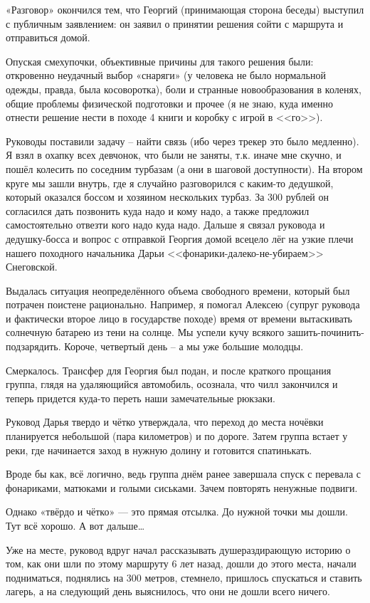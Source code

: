 «Разговор» окончился тем, что Георгий (принимающая сторона беседы) выступил с публичным заявлением: он заявил о принятии решения сойти с маршрута и отправиться домой.

Опуская смехупочки, объективные причины для такого решения были: откровенно неудачный выбор «снаряги» (у человека не было нормальной одежды, правда, была косоворотка), боли и странные новообразования в коленях, общие проблемы физической подготовки и прочее (я не знаю, куда именно отнести решение нести в походе 4 книги и коробку с игрой в <<го>>).

Руководы поставили задачу – найти связь (ибо через трекер это было медленно). Я взял в охапку всех девчонок, что были не заняты, т.к. иначе мне скучно, и пошёл колесить по соседним турбазам (а они в шаговой доступности). На втором круге мы зашли внутрь, где я случайно разговорился с каким-то дедушкой, который оказался боссом и хозяином нескольких турбаз. За 300 рублей он согласился дать позвонить куда надо и кому надо, а также предложил самостоятельно отвезти кого надо куда надо. Дальше я связал руковода и дедушку-босса и вопрос с отправкой Георгия домой всецело лёг на узкие плечи нашего походного начальника Дарьи <<фонарики-далеко-не-убираем>> Снеговской.

Выдалась ситуация неопределённого объема свободного времени, который был потрачен поистене рационально. Например, я помогал Алексею (супруг руковода и фактически второе лицо в государстве походе) время от времени вытаскивать солнечную батарею из тени на солнце. Мы успели кучу всякого зашить-починить-подзарядить. Короче, четвертый день – а мы уже большие молодцы.

Смеркалось. Трансфер для Георгия был подан, и после краткого прощания группа, глядя на удаляющийся автомобиль, осознала, что чилл закончился и теперь придется куда-то переть наши замечательные рюкзаки.

Руковод Дарья твердо и чётко утверждала, что переход до места ночёвки планируется небольшой (пара километров) и по дороге. Затем группа встает у реки, где начинается заход в нужную долину и готовится спатинькать.

Вроде бы как, всё логично, ведь группа днём ранее завершала спуск с перевала с фонариками, матюками и голыми сиськами. Зачем повторять ненужные подвиги. 

Однако «твёрдо и чётко» — это прямая отсылка. До нужной точки мы дошли. Тут всё хорошо. А вот дальше…

Уже на месте, руковод вдруг начал рассказывать душераздирающую историю о том, как они шли по этому маршруту 6 лет назад, дошли до этого места, начали подниматься, поднялись на 300 метров, стемнело, пришлось спускаться и ставить лагерь, а на следующий день выяснилось, что они не дошли всего ничего.

